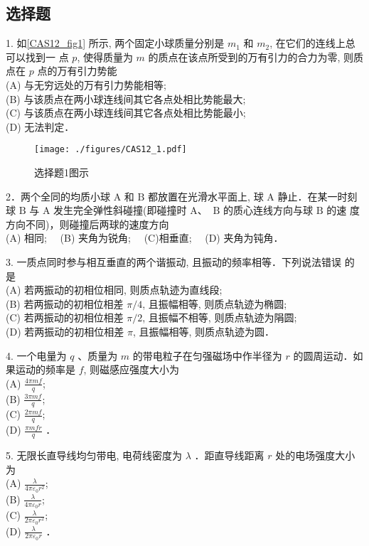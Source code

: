 \subsection{选择题}
1. 如\autoref{CAS12_fig1} 所示, 两个固定小球质量分别是 $m_{1}$ 和 $m_{2}$, 在它们的连线上总可以找到一
点 $p$, 使得质量为 $m$ 的质点在该点所受到的万有引力的合力为零, 则质点在 $p$
点的万有引力势能\\
(A) 与无穷远处的万有引力势能相等;\\
(B) 与该质点在两小球连线间其它各点处相比势能最大;\\
(C) 与该质点在两小球连线间其它各点处相比势能最小;\\
(D) 无法判定．
\begin{figure}[ht]
\centering
\texttt{[image: ./figures/CAS12\_1.pdf]}
\caption{选择题1图示} \label{CAS12_fig1}
\end{figure}
2．两个全同的均质小球 $\mathrm{A}$ 和 $\mathrm{B}$ 都放置在光滑水平面上, 球 $\mathrm{A}$ 静止．在某一时刻 球 $\mathrm{B}$ 与 $\mathrm{A}$ 发生完全弹性斜碰撞(即碰撞时 $\mathrm{A}$、 $\mathrm{~B}$ 的质心连线方向与球 $\mathrm{B}$ 的速 度方向不同)，则碰撞后两球的速度方向\\
(A) 相同;$\quad$
(B) 夹角为锐角;$\quad$
(C)相垂直;$\quad$
(D) 夹角为钝角．

3. 一质点同时参与相互垂直的两个谐振动, 且振动的频率相等．下列说法错误 的是\\
(A) 若两振动的初相位相同, 则质点轨迹为直线段;\\
(B) 若两振动的初相位相差 $\pi / 4$, 且振幅相等, 则质点轨迹为椭圆;\\
(C) 若两振动的初相位相差 $\pi / 2$, 且振幅不相等, 则质点轨迹为䧎圆;\\
(D) 若两振动的初相位相差 $\pi$, 且振幅相等, 则质点轨迹为圆．

4. 一个电量为 $q$ 、质量为 $m$ 的带电粒子在匀强磁场中作半径为 $r$ 的圆周运动．如果运动的频率是 $f$, 则磁感应强度大小为\\
(A) $\frac{4 \pi m f}{q}$;\\
(B) $\frac{3 \pi m f}{q}$;\\
(C) $\frac{2 \pi m f}{q}$;\\
(D) $\frac{\pi m f r}{q}$ ．

5. 无限长直导线均匀带电, 电荷线密度为 $\lambda$ ．距直导线距离 $r$ 处的电场强度大小为\\
(A) $\frac{\lambda}{4 \pi \varepsilon_{0} r^{2}}$;\\
(B) $\frac{\lambda}{4 \pi \varepsilon_{0} r}$;\\
(C) $\frac{\lambda}{2 \pi \varepsilon_{0} r^{2}}$;\\
(D) $\frac{\lambda}{2 \pi \varepsilon_{0} r}$ ．

